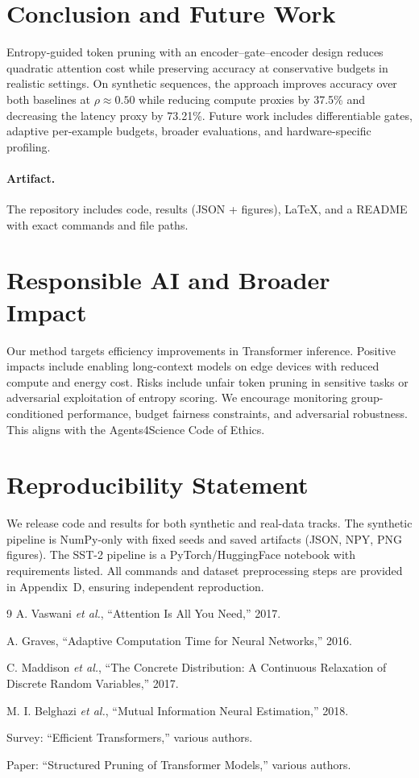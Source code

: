 \documentclass{article}
\newcommand{\keep}{0.50}         %
\newcommand{\flopsred}{37.5\%}   %
\newcommand{\latred}{73.21\%}    %
\begin{document}
\section{Conclusion and Future Work}
Entropy-guided token pruning with an encoder--gate--encoder design reduces quadratic attention cost while preserving accuracy at conservative budgets in realistic settings. On synthetic sequences, the approach improves accuracy over both baselines at $\rho{\approx}\keep$ while reducing compute proxies by \flopsred{} and decreasing the latency proxy by \latred{}. Future work includes differentiable gates, adaptive per-example budgets, broader evaluations, and hardware-specific profiling.

\paragraph{Artifact.} The repository includes code, results (JSON + figures), LaTeX, and a README with exact commands and file paths.

\section{Responsible AI and Broader Impact}
Our method targets efficiency improvements in Transformer inference. 
Positive impacts include enabling long-context models on edge devices with reduced compute and energy cost. 
Risks include unfair token pruning in sensitive tasks or adversarial exploitation of entropy scoring. 
We encourage monitoring group-conditioned performance, budget fairness constraints, 
and adversarial robustness. 
This aligns with the Agents4Science Code of Ethics.

\section{Reproducibility Statement}
We release code and results for both synthetic and real-data tracks. 
The synthetic pipeline is NumPy-only with fixed seeds and saved artifacts (JSON, NPY, PNG figures). 
The SST-2 pipeline is a PyTorch/HuggingFace notebook with requirements listed. 
All commands and dataset preprocessing steps are provided in Appendix~D, 
ensuring independent reproduction.


\begin{thebibliography}{9}
A. Vaswani \emph{et al.}, ``Attention Is All You Need,'' 2017.

A. Graves, ``Adaptive Computation Time for Neural Networks,'' 2016.

C. Maddison \emph{et al.}, ``The Concrete Distribution: A Continuous Relaxation of Discrete Random Variables,'' 2017.

M. I. Belghazi \emph{et al.}, ``Mutual Information Neural Estimation,'' 2018.

Survey: ``Efficient Transformers,'' various authors.

Paper: ``Structured Pruning of Transformer Models,'' various authors.
\end{thebibliography}
\end{document}
